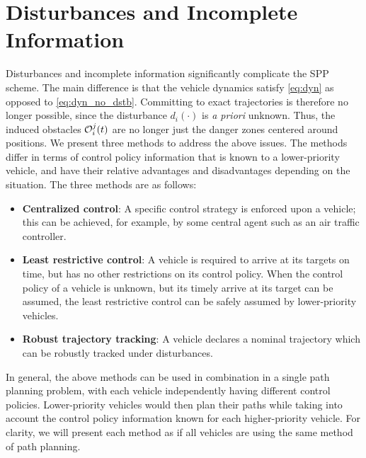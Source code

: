 \section{Disturbances and Incomplete Information \label{sec:incomp}}
Disturbances and incomplete information significantly complicate the SPP scheme. The main difference is that the vehicle dynamics satisfy \eqref{eq:dyn} as opposed to \eqref{eq:dyn_no_dstb}. Committing to exact trajectories is therefore no longer possible, since the disturbance $d_i(\cdot)$ is \textit{a priori} unknown. Thus, the induced obstacles $\mathcal{O}_i^j(t)$ are no longer just the danger zones centered around positions. We present three methods to address the above issues. The methods differ in terms of control policy information that is known to a lower-priority vehicle, and have their relative advantages and disadvantages depending on the situation. The three methods are as follows:
\begin{itemize}
\item \textbf{Centralized control}: A specific control strategy is enforced upon a vehicle; this can be achieved, for example, by some central agent such as an air traffic controller.
\item \textbf{Least restrictive control}: A vehicle is required to arrive at its targets on time, but has no other restrictions on its control policy. When the control policy of a vehicle is unknown, but its timely arrive at its target can be assumed, the least restrictive control can be safely assumed by lower-priority vehicles.
\item \textbf{Robust trajectory tracking}: A vehicle declares a nominal trajectory which can be robustly tracked under disturbances.
\end{itemize}

In general, the above methods can be used in combination in a single path planning problem, with each vehicle independently having different control policies. Lower-priority vehicles would then plan their paths while taking into account the control policy information known for each higher-priority vehicle. For clarity, we will present each method as if all vehicles are using the same method of path planning.

